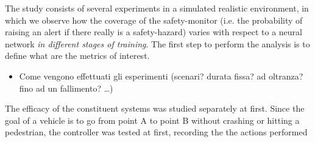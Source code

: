 The study consists of several experiments in a simulated realistic environment, in which we observe how the coverage of the safety-monitor (i.e. the probability of raising an alert if there really is a safety-hazard) varies with respect to a neural network \textsl{in different stages of training}.\newline
The first step to perform the analysis is to define what are the metrics of interest.

	\begin{itemize}
		
		\item Come vengono effettuati gli esperimenti (scenari? durata fissa? ad oltranza? fino ad un fallimento? \dots)
		
	\end{itemize}

The efficacy of the constituent systems was studied separately at first. Since the goal of a vehicle is to go from point A to point B without crashing or hitting a pedestrian, the controller was tested at first, recording the the actions performed 